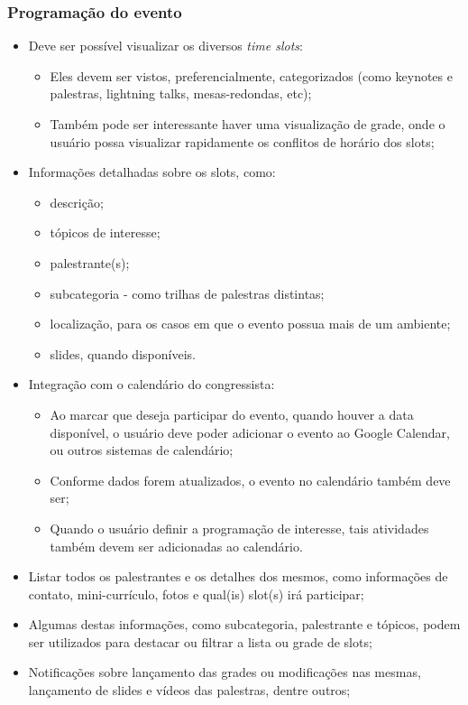 \documentclass[12pt,a4paper,twoside,hyphens,english,brazil]{abntex2}
\begin{document}
\subsubsection*{Programação do evento}
\begin{itemize}
	\item Deve ser possível visualizar os diversos \emph{time slots}:
		\begin{itemize}
			\item Eles devem ser vistos, preferencialmente, categorizados (como keynotes e palestras, lightning talks, mesas-redondas, etc);
			\item Também pode ser interessante haver uma visualização de grade, onde o usuário possa visualizar rapidamente os conflitos de horário dos slots;
		\end{itemize}
	\item Informações detalhadas sobre os slots, como:
		\begin{itemize}
			\item descrição;
			\item tópicos de interesse;
			\item palestrante(s);
			\item subcategoria - como trilhas de palestras distintas;
			\item localização, para os casos em que o evento possua mais de um ambiente;
			\item slides, quando disponíveis.
		\end{itemize}
	\item Integração com o calendário do congressista:
		\begin{itemize}
			\item Ao marcar que deseja participar do evento, quando houver a data disponível, o usuário deve poder adicionar o evento ao Google Calendar, ou outros sistemas de calendário;
			\item Conforme dados forem atualizados, o evento no calendário também deve ser;
			\item Quando o usuário definir a programação de interesse, tais atividades também devem ser adicionadas ao calendário.
		\end{itemize}
	\item Listar todos os palestrantes e os detalhes dos mesmos, como informações de contato, mini-currículo, fotos e qual(is) slot(s) irá participar;
	\item Algumas destas informações, como subcategoria, palestrante e tópicos, podem ser utilizados para destacar ou filtrar a lista ou grade de slots;
	\item Notificações sobre lançamento das grades ou modificações nas mesmas, lançamento de slides e vídeos das palestras, dentre outros;
\end{itemize}
\end{document}
